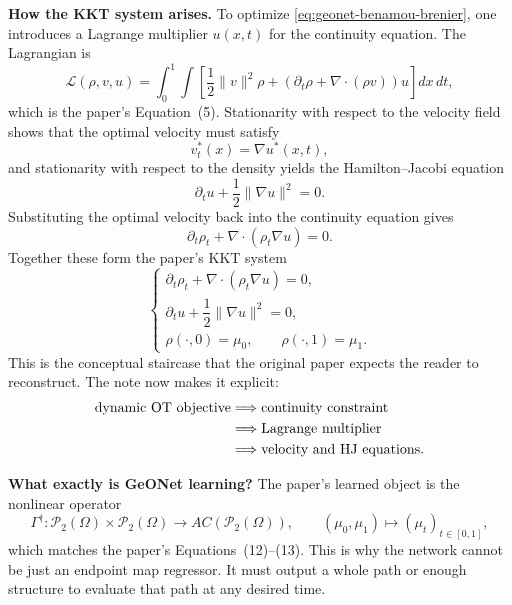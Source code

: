 \documentclass[11pt]{report}
\newcommand{\calP}{\mathcal{P}}
\begin{document}
\textbf{How the KKT system arises.}
To optimize \eqref{eq:geonet-benamou-brenier}, one introduces a Lagrange
multiplier $u(x,t)$ for the continuity equation.  The Lagrangian is
\begin{equation}
\mathcal L(\rho,v,u)
=
\int_0^1\int
\left[
\frac12\|v\|^2\rho + (\partial_t\rho + \nabla\cdot(\rho v))u
\right]dx\,dt,
\label{eq:geonet-lagrangian}
\end{equation}
which is the paper's Equation~(5).  Stationarity with respect to the velocity field
shows that the optimal velocity must satisfy
\begin{equation}
v_t^*(x)=\nabla u^*(x,t),
\label{eq:geonet-optimal-velocity}
\end{equation}
and stationarity with respect to the density yields the Hamilton--Jacobi equation
\begin{equation}
\partial_t u + \frac12\|\nabla u\|^2 = 0.
\label{eq:geonet-hj}
\end{equation}
Substituting the optimal velocity back into the continuity equation gives
\begin{equation}
\partial_t\rho_t + \nabla\cdot(\rho_t\nabla u)=0.
\label{eq:geonet-continuity}
\end{equation}
Together these form the paper's KKT system
\begin{equation}
\begin{cases}
\partial_t\rho_t + \nabla\cdot(\rho_t\nabla u)=0,\\
\partial_t u + \dfrac12\|\nabla u\|^2=0,\\
\rho(\cdot,0)=\mu_0,\qquad \rho(\cdot,1)=\mu_1.
\end{cases}
\label{eq:geonet-kkt}
\end{equation}
This is the conceptual staircase that the original paper expects the reader to
reconstruct.  The note now makes it explicit:
\begin{align}
\text{dynamic OT objective}
&\Longrightarrow
\text{continuity constraint}
\notag\\
&\Longrightarrow
\text{Lagrange multiplier}
\notag\\
&\Longrightarrow
\text{velocity and HJ equations}.
\label{eq:geonet-logic-chain}
\end{align}

\textbf{What exactly is GeONet learning?}
The paper's learned object is the nonlinear operator
\begin{equation}
\Gamma^\dagger : \calP_2(\Omega)\times\calP_2(\Omega) \to AC(\calP_2(\Omega)),
\qquad
(\mu_0,\mu_1)\mapsto (\mu_t)_{t\in[0,1]},
\label{eq:geonet-operator}
\end{equation}
which matches the paper's Equations~(12)--(13).  This is why the network cannot be
just an endpoint map regressor.  It must output a whole path or enough structure to
evaluate that path at any desired time.
\end{document}
